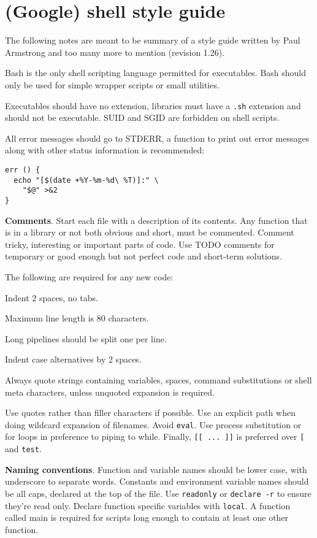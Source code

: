 \section{(Google) shell style guide}
The following notes are meant to be summary of a style guide written by Paul Armstrong and too many more to mention (revision 1.26).

Bash is the only shell scripting language permitted for executables.
Bash should only be used for simple wrapper scripts or small utilities.

Executables should have no extension, libraries must have a \texttt{.sh} extension and should not be executable.
SUID and SGID are forbidden on shell scripts.

All error messages should go to STDERR,
a function to print out error messages along with other status information is recommended:
\begin{verbatim}
err () {
  echo "[$(date +%Y-%m-%d\ %T)]:" \
    "$@" >&2
}
\end{verbatim}

\textbf{Comments}.
Start each file with a description of its contents.
Any function that is in a library or not both obvious and short, must be commented.
Comment tricky, interesting or important parts of code.
Use TODO comments for temporary or good enough but not perfect code and short-term solutions.

The following are required for any new code:
\begin{compactenum}
    \item Indent 2 spaces, no tabs.
    \item Maximum line length is 80 characters.
    \item Long pipelines should be split one per line.
    \item Indent case alternatives by 2 spaces.
    \item Always quote strings containing variables, spaces, command substitutions or shell meta characters, unless unquoted expansion is required. 
\end{compactenum}

Use quotes rather than filler characters if possible.
Use an explicit path when doing wildcard expansion of filenames.
Avoid \texttt{eval}.
Use process substitution or for loops in preference to piping to while.
Finally, \texttt{[[ ... ]]} is preferred over \texttt{[} and \texttt{test}.

\textbf{Naming conventions}.
Function and variable names should be lower case, with underscore to separate words.
Constants and environment variable names should be all caps, declared at the top of the file.
Use \texttt{readonly} or \texttt{declare -r} to ensure they're read only.
Declare function specific variables with \texttt{local}.
A function called main is required for scripts long enough to contain at least one other function.

